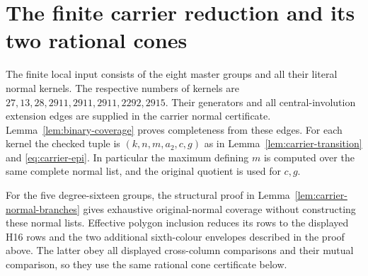 \section{The finite carrier reduction and its two rational cones}
\label{sec:carrier-cones}
The finite local input consists of the eight master groups and all their
literal normal kernels. The respective numbers of kernels are
$27,13,28,2911,2911,2911,2292,2915$. Their generators and all
central-involution extension edges are supplied in the carrier normal
certificate. Lemma~\ref{lem:binary-coverage} proves completeness from
these edges. For each kernel the checked tuple is
$(k,n,m,a_2,c,g)$ as in Lemma~\ref{lem:carrier-transition} and
\eqref{eq:carrier-epi}. In particular the maximum defining $m$ is
computed over the same complete normal list, and the original quotient
is used for $c,g$.

For the five degree-sixteen groups, the structural proof in
Lemma~\ref{lem:carrier-normal-branches} gives exhaustive original-normal
coverage without constructing these normal lists. Effective polygon
inclusion reduces its rows to the displayed H16 rows and the two
additional sixth-colour envelopes described in the proof above.
The latter obey all displayed cross-column comparisons and their mutual
comparison, so they use the same rational cone certificate below.


